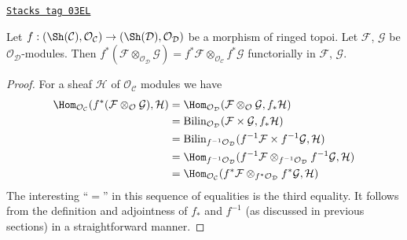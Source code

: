 \begin{lemma}
\label{sites-modules-lemma-tensor-product-pullback}
\href{https://stacks.math.columbia.edu/tag/03EL}{\texttt{Stacks tag 03EL}}

Let $f : (\Sh(\mathcal{C}), \mathcal{O}_\mathcal{C})
\to (\Sh(\mathcal{D}), \mathcal{O}_\mathcal{D})$ be
a morphism of ringed topoi. Let $\mathcal{F}$, $\mathcal{G}$
be $\mathcal{O}_\mathcal{D}$-modules. Then
$f^*(\mathcal{F} \otimes_{\mathcal{O}_\mathcal{D}} \mathcal{G})
= f^*\mathcal{F} \otimes_{\mathcal{O}_\mathcal{C}} f^*\mathcal{G}$
functorially in $\mathcal{F}$, $\mathcal{G}$.
\end{lemma}

\begin{proof}
For a sheaf $\mathcal{H}$ of $\mathcal{O}_\mathcal{C}$ modules we
have
\begin{align*}
\Hom_{\mathcal{O}_\mathcal{C}}(
f^*(\mathcal{F} \otimes_\mathcal{O} \mathcal{G}), \mathcal{H})
& =
\Hom_{\mathcal{O}_\mathcal{D}}(
\mathcal{F} \otimes_\mathcal{O} \mathcal{G}, f_*\mathcal{H}) \\
& =
\text{Bilin}_{\mathcal{O}_\mathcal{D}}(
\mathcal{F} \times \mathcal{G}, f_*\mathcal{H}) \\
& =
\text{Bilin}_{f^{-1}\mathcal{O}_\mathcal{D}}(
f^{-1}\mathcal{F} \times f^{-1}\mathcal{G}, \mathcal{H}) \\
& =
\Hom_{f^{-1}\mathcal{O}_\mathcal{D}}(
f^{-1}\mathcal{F} \otimes_{f^{-1}\mathcal{O}_\mathcal{D}} f^{-1}\mathcal{G},
\mathcal{H}) \\
& =
\Hom_{\mathcal{O}_\mathcal{C}}(
f^*\mathcal{F} \otimes_{f^*\mathcal{O}_\mathcal{D}} f^*\mathcal{G},
\mathcal{H})
\end{align*}
The interesting ``$=$'' in this sequence of equalities is the
third equality. It follows from the definition and adjointness of
$f_*$ and $f^{-1}$ (as discussed in previous sections) in a
straightforward manner.
\end{proof}


